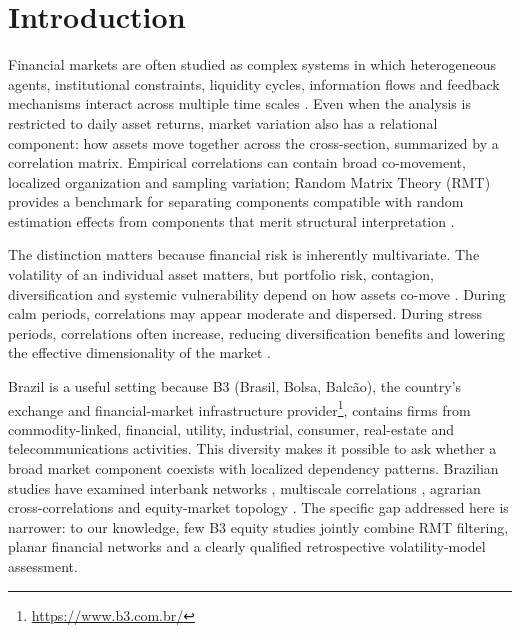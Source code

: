 \section{Introduction}
\label{sec:introduction}

Financial markets are often studied as complex systems in which heterogeneous agents, institutional constraints, liquidity cycles, information flows and feedback mechanisms interact across multiple time scales \cite{mantegna_stanley_1999_book,cont_2001_empirical}. Even when the analysis is restricted to daily asset returns, market variation also has a relational component: how assets move together across the cross-section, summarized by a correlation matrix. Empirical correlations can contain broad co-movement, localized organization and sampling variation; Random Matrix Theory (RMT) provides a benchmark for separating components compatible with random estimation effects from components that merit structural interpretation \cite{laloux_1999_noise,plerou_2002_random,bun_2017_cleaning}.

The distinction matters because financial risk is inherently multivariate. The volatility of an individual asset matters, but portfolio risk, contagion, diversification and systemic vulnerability depend on how assets co-move \cite{billio_2012_econometric}. During calm periods, correlations may appear moderate and dispersed. During stress periods, correlations often increase, reducing diversification benefits and lowering the effective dimensionality of the market \cite{junior_2012_correlation,zheng_2012_changes}.

Brazil is a useful setting because B3 (Brasil, Bolsa, Balc\~ao), the country's exchange and financial-market infrastructure provider\footnote{\url{https://www.b3.com.br/}}, contains firms from commodity-linked, financial, utility, industrial, consumer, real-estate and telecommunications activities. This diversity makes it possible to ask whether a broad market component coexists with localized dependency patterns. Brazilian studies have examined interbank networks \cite{tabak_2010_topology}, multiscale correlations \cite{pereira_2019_multiscale}, agrarian cross-correlations \cite{stosic_2015_correlations} and equity-market topology \cite{leonel_2022_brazilian}. The specific gap addressed here is narrower: to our knowledge, few B3 equity studies jointly combine RMT filtering, planar financial networks and a clearly qualified retrospective volatility-model assessment.

